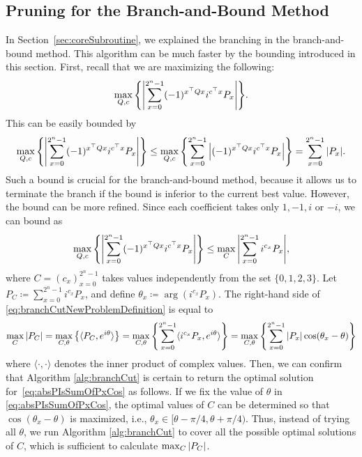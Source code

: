 \documentclass[aps,prx,onecolumn,superscriptaddress,nobibnotes,nofootinbib]{revtex4-2}
\newcommand{\defeq}{\coloneqq}
\begin{document}
\subsection{Pruning for the Branch-and-Bound Method}
\label{sec:Pruning}

In Section~\ref{sec:coreSubroutine}, we explained the branching in the branch-and-bound method.
This algorithm can be much faster
by the bounding introduced in this section.
First, recall that we are maximizing the following:
\begin{equation*}
  \max_{Q,c} \qty{ \abs{\sum_{x=0}^{2^n-1} (-1)^{x^\top Q x} i^{c^\top x} P_x} }.
\end{equation*}
This can be easily bounded by
\begin{equation*}
  \max_{Q,c} \qty{ \abs{\sum_{x=0}^{2^n-1} (-1)^{x^\top Q x} i^{c^\top x} P_x} }
  \leq \max_{Q,c} \qty{ \sum_{x=0}^{2^n-1} \abs{(-1)^{x^\top Q x} i^{c^\top x} P_x} }
  = \sum_{x=0}^{2^n-1} \abs{P_x}.
\end{equation*}
Such a bound is crucial for the branch-and-bound method,
because it allows us to terminate the branch if the bound is inferior to the current best value.
However, the bound can be more refined.
Since each coefficient takes only
$1, -1, i$ or $-i$, we can bound as
\begin{equation}\label{eq:branchCutNewProblemDefinition}
  \max_{Q,c} \qty{ \abs{\sum_{x=0}^{2^n-1} (-1)^{x^\top Q x} i^{c^\top x} P_x} }
  \leq \max_{C} \abs{\sum_{x=0}^{2^n-1} i^{c_x} P_x} ,
\end{equation}
where $C=(c_x)_{x=0}^{2^n-1}$ takes values independently from the set $\{0, 1, 2, 3\}$.
Let $P_C \defeq \sum_{x=0}^{2^n-1} i^{c_x} P_x$,
and define $\theta_x \defeq \arg(i^{c_x}P_x)$.
The right-hand side of \eqref{eq:branchCutNewProblemDefinition} is equal to
\begin{equation}\label{eq:absPIsSumOfPxCos}
  \max_{C} \abs{P_C}
  = \max_{C, \theta} \qty{ \langle P_C, e^{i \theta} \rangle }
  = \max_{C, \theta} \qty{\sum_{x=0}^{2^n-1} \langle i^{c_x} P_x, e^{i \theta} \rangle}
  = \max_{C, \theta} \qty{\sum_{x=0}^{2^n-1} \abs{P_x} \cos(\theta_x -\theta)}
\end{equation}
where $\langle \cdot, \cdot \rangle$ denotes the inner product of complex values.
Then, we can confirm that Algorithm \ref{alg:branchCut} is
certain to return the optimal solution for~\eqref{eq:absPIsSumOfPxCos} as follows.
If we fix the value of $\theta$ in \eqref{eq:absPIsSumOfPxCos}, the optimal values of $C$ can be determined so that $\cos(\theta_x - \theta)$ is maximized, i.e., $\theta_x \in [\theta - \pi / 4, \theta + \pi / 4)$.
Thus, instead of trying all $\theta$, we run Algorithm \ref{alg:branchCut} to cover all the possible optimal solutions of $C$, which is sufficient to calculate $\max_{C} \abs{P_C}$.
\end{document}
